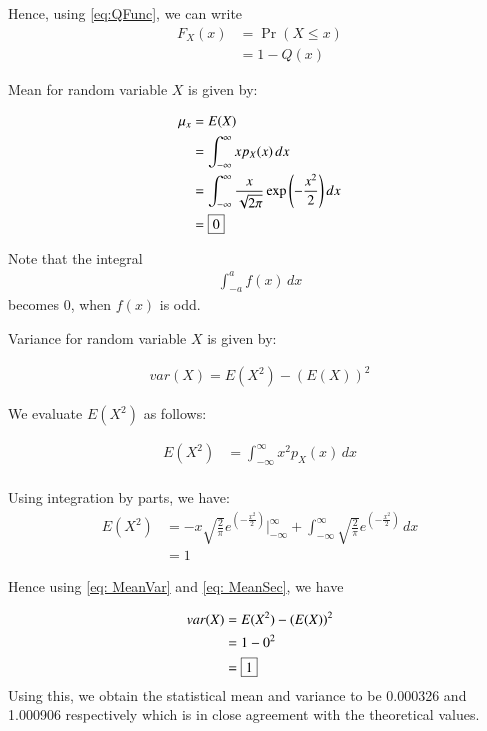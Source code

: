 \documentclass[journal,12pt,twocolumn]{IEEEtran}
\renewcommand\thesection{\arabic{section}}
\begin{document}
\begin{enumerate}[label=\thesection.\arabic*
,ref=\thesection.\theenumi]
	Hence, using \eqref{eq:QFunc}, we can write
	\begin{align}
		F_X(x) &= \Pr(X \leq x) \\
		&= 1 - Q(x)
		\label{eq:FinalCDF}
	\end{align}

	Mean for random variable $X$ is given by:
	
	\begin{align}
		\mu_x &= E(X) \\
		&= \int^{\infty}_{-\infty} x p_X(x) \,dx \\
		&= \int^{\infty}_{-\infty} \frac{x}{\sqrt{2\pi}}\exp{\left(-\frac{x^2}{2}\right)} \,dx \\
		&= \fbox{0}
	\end{align}

	Note that the integral
	\begin{align}
		\int^a_{-a} f(x) \,dx
	\end{align}
	becomes 0, when $f(x)$ is odd.
	
	Variance for random variable $X$ is given by:

	\begin{align}
		var(X) = E(X^2) - (E(X))^2
		\label{eq: MeanVar}
	\end{align}

	We evaluate $E(X^2)$ as follows:

	\begin{align}
		E(X^2) &= \int^{\infty}_{-\infty} x^2 p_X(x) \,dx \\
	\end{align}

	Using integration by parts, we have:
	\begin{align}
		E(X^2) &= -x\sqrt{\frac{2}{\pi}} e^{\left(-\frac{x^2}{2}\right)}\Bigg|_{-\infty}^{\infty} +  \int^{\infty}_{-\infty} \sqrt{\frac{2}{\pi}} e^{\left(-\frac{x^2}{2}\right)} \,dx \\
		&= 1
		\label{eq: MeanSec}
	\end{align}

	Hence using \eqref{eq: MeanVar} and \eqref{eq: MeanSec}, we have

	\begin{align}
		var(X) &= E(X^2) - (E(X))^2 \\
		&= 1 - 0^2 \\
		&= \fbox{1}
	\end{align}
Using this, we obtain the statistical mean and variance to be 0.000326 and 1.000906 respectively which is in close agreement with the theoretical values.

\end{enumerate}
\end{document}
